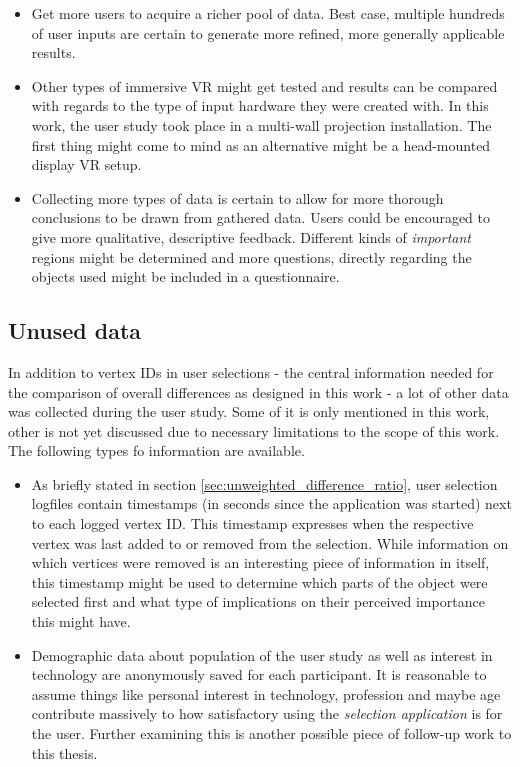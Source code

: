 \begin{itemize}
	\item Get more users to acquire a richer pool of data. Best case, multiple hundreds of user inputs are certain to generate more refined, more generally applicable results.
	\item Other types of immersive VR might get tested and results can be compared with regards to the type of input hardware they were created with. In this work, the user study took place in a multi-wall projection installation. The first thing might come to mind as an alternative might be a head-mounted display VR setup.
	\item Collecting more types of data is certain to allow for more thorough conclusions to be drawn from gathered data. Users could be encouraged to give more qualitative, descriptive feedback. Different kinds of \textit{important} regions might be determined and more questions, directly regarding the objects used might be included in a questionnaire.
\end{itemize}

	\subsection{Unused data}
	\label{sec:unused_data}
In addition to vertex IDs in user selections - the central information needed for the comparison of overall differences as designed in this work - a lot of other data was collected during the user study. Some of it is only mentioned in this work, other is not yet discussed due to necessary limitations to the scope of this work. The following types fo information are available.

\begin{itemize}
	\item As briefly stated in section \ref{sec:unweighted_difference_ratio}, user selection logfiles contain timestamps (in seconds since the application was started) next to each logged vertex ID. This timestamp expresses when the respective vertex was last added to or removed from the selection. While information on which vertices were removed is an interesting piece of information in itself, this timestamp might be used to determine which parts of the object were selected first and what type of implications on their perceived importance this might have.
	\item Demographic data about population of the user study as well as interest in technology are anonymously saved for each participant. It is reasonable to assume things like personal interest in technology, profession and maybe age contribute massively to how satisfactory using the \textit{selection application} is for the user. Further examining this is another possible piece of follow-up work to this thesis.
\end{itemize}

